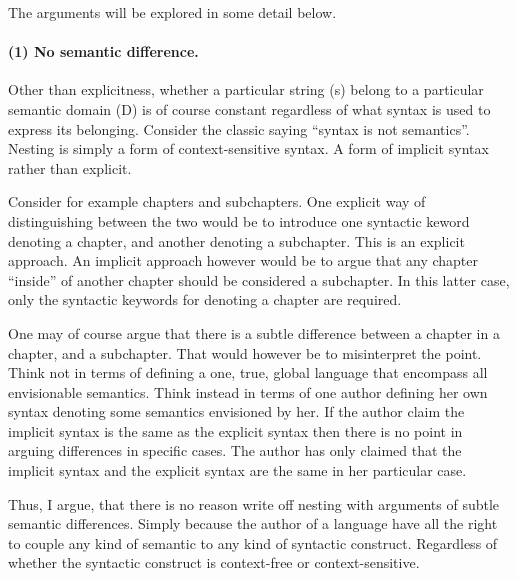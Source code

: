 \documentclass{scrreprt}
\begin{document}
The arguments will be explored in some detail below.



\paragraph{(1) No semantic difference.}
Other than explicitness, whether a particular string (s) belong to a particular semantic domain (D) is of course constant regardless of what syntax is used to express its belonging. Consider the classic saying ``syntax is not semantics''. Nesting is simply a form of context-sensitive syntax. A form of implicit syntax rather than explicit.

Consider for example chapters and subchapters. One explicit way of distinguishing between the two would be to introduce one syntactic keword denoting a chapter, and another denoting a subchapter. This is an explicit approach. An implicit approach however would be to argue that any chapter ``inside'' of another chapter should be considered a subchapter. In this latter case, only the syntactic keywords for denoting a chapter are required.

One may of course argue that there is a subtle difference between a chapter in a chapter, and a subchapter. That would however be to misinterpret the point. Think not in terms of defining a one, true, global language that encompass all envisionable semantics. Think instead in terms of one author defining her own syntax denoting some semantics envisioned by her. If the author claim the implicit syntax is the same as the explicit syntax then there is no point in arguing differences in specific cases. The author has only claimed that the implicit syntax and the explicit syntax are the same in her particular case.

Thus, I argue, that there is no reason write off nesting with arguments of subtle semantic differences. Simply because the author of a language have all the right to couple any kind of semantic to any kind of syntactic construct. Regardless of whether the syntactic construct is context-free or context-sensitive.




\end{document}
